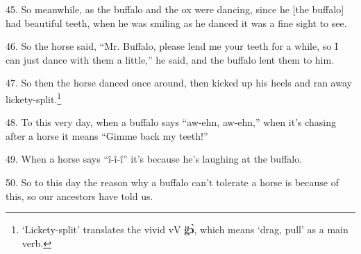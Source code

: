 45. So meanwhile, as the buffalo and the ox were dancing, since he [the buffalo]
had beautiful teeth, when he was smiling as he danced it was a fine sight to see.

46. So the horse said, ``Mr. Buffalo, please lend me your teeth for a while, so
I can just dance with them a little,'' he said, and the buffalo lent them to him.

47. So then the horse danced once around, then kicked up his heels and ran away
lickety-split.\footnote{`Lickety-split' translates the vivid vV \textbf{g̈ɔ̀}, which means `drag, pull' as a main verb.}

48. To this very day, when a buffalo says ``aw-ehn, aw-ehn,'' when it's chasing
after a horse it means ``Gimme back my teeth!''

49. When a horse says ``î-î-î'' it's because he's laughing at the buffalo.

50. So to this day the reason why a buffalo can't tolerate a horse is because of
this, so our ancestors have told us.

